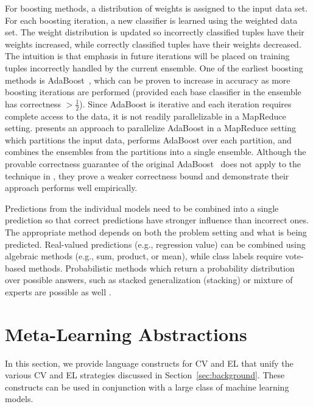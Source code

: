 \documentclass{vldb}
\begin{document}
For boosting methods, a distribution of weights is assigned to the input data set.
For each boosting iteration, a new classifier is learned using the weighted data set.
The weight distribution is updated so incorrectly classified tuples have their weights
increased, while correctly classified tuples have their weights decreased.
The intuition is that emphasis in future iterations will be placed on training tuples
incorrectly handled by the current ensemble. One of the earliest boosting methods
is AdaBoost~\cite{DBLP:journals/jcss/FreundS97}, which can
be proven to increase in accuracy as more boosting iterations are performed (provided each
base classifier in the ensemble has correctness $> \frac{1}{2}$). Since AdaBoost is iterative
and each iteration requires complete access to the data, it is not readily parallelizable in
a MapReduce setting. \cite{parallel-boosting} presents an approach to parallelize AdaBoost
in a MapReduce setting which partitions the input data, performs AdaBoost over each partition,
and combines the ensembles from the partitions into a single ensemble. Although the provable
correctness guarantee of the original AdaBoost~\cite{DBLP:journals/jcss/FreundS97}
does not apply to the technique in \cite{parallel-boosting}, they prove a weaker
correctness bound and demonstrate their approach performs well empirically.

Predictions from the individual models need to be combined into a single prediction
so that correct predictions have stronger influence than incorrect ones. The
appropriate method depends on both the problem setting and what is being predicted.
Real-valued predictions (e.g., regression value) can be combined using algebraic
methods (e.g., sum, product, or mean), while class labels require vote-based methods.
Probabilistic methods which return a probability distribution over possible answers,
such as stacked generalization (stacking) or mixture of experts are possible as
well \cite{DBLP:journals/scholarpedia/Polikar09}.


\section{Meta-Learning Abstractions}
\label{sec:abstraction}
In this section, we provide language constructs for CV and EL that unify the various
CV and EL strategies discussed in Section~\ref{sec:background}.
These constructs can be used in conjunction with
a large class of machine learning models.
\end{document}
